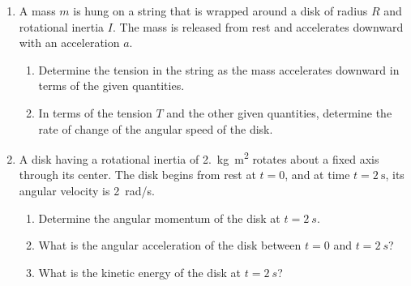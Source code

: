 \documentclass{../../oss-apphys}
\begin{document}
\begin{center}
\end{center}
\newpage



\begin{enumerate}[leftmargin=15pt]

\item A mass $m$ is hung on a string that is wrapped around a disk of radius
  $R$ and rotational inertia $I$. The mass is released from rest and
  accelerates downward with an acceleration $a$.
  \begin{enumerate}[noitemsep]
  \item Determine the tension in the string as the mass accelerates downward
    in terms of the given quantities.
  \item In terms of the tension $T$ and the other given quantities, determine
    the rate of change of the angular speed of the disk.
  \end{enumerate}
  \vspace{0.5in}
  
\item A disk having a rotational inertia of \SI{2.}{\kilo\gram.\metre^2}
  rotates about a fixed axis through its center. The disk begins from rest at
  $t=0$, and at time $t=\SI{2}{\s}$, its angular velocity is \SI{2}{rad/s}.
  \begin{enumerate}[noitemsep]
  \item Determine the angular momentum of the disk at $t=\SI{2}{s}$.
  \item What is the angular acceleration of the disk between $t=0$ and
    $t=\SI{2}{s}$?
  \item What is the kinetic energy of the disk at $t=\SI{2}{s}$?
  \end{enumerate}
\end{enumerate}
\end{document}
